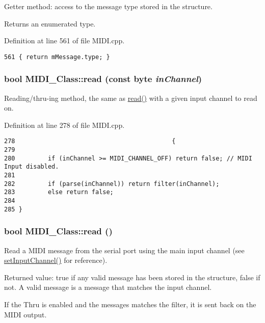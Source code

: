 Getter method: access to the message type stored in the structure. \par
 Returns an enumerated type. 

Definition at line 561 of file MIDI.cpp.

\begin{Code}\begin{verbatim}561 { return mMessage.type; }
\end{verbatim}
\end{Code}


\hypertarget{class_m_i_d_i___class_581b5b973cd81e5aa9d6b91c220342b7}{
\subsubsection[{read}]{\setlength{\rightskip}{0pt plus 5cm}bool MIDI\_\-Class::read (const {\bf byte} {\em inChannel})}}
\label{class_m_i_d_i___class_581b5b973cd81e5aa9d6b91c220342b7}


Reading/thru-ing method, the same as \hyperlink{class_m_i_d_i___class_8e7be5af3a32cb91f596dbb8d8c297bf}{read()} with a given input channel to read on. 

Definition at line 278 of file MIDI.cpp.

\begin{Code}\begin{verbatim}278                                           {
279         
280         if (inChannel >= MIDI_CHANNEL_OFF) return false; // MIDI Input disabled.
281         
282         if (parse(inChannel)) return filter(inChannel);
283         else return false;
284         
285 }
\end{verbatim}
\end{Code}


\hypertarget{class_m_i_d_i___class_8e7be5af3a32cb91f596dbb8d8c297bf}{
\subsubsection[{read}]{\setlength{\rightskip}{0pt plus 5cm}bool MIDI\_\-Class::read ()}}
\label{class_m_i_d_i___class_8e7be5af3a32cb91f596dbb8d8c297bf}


Read a MIDI message from the serial port using the main input channel (see \hyperlink{class_m_i_d_i___class_35a66d47ba598c7ebbee7fbf654dafe8}{setInputChannel()} for reference). \par
 Returned value: true if any valid message has been stored in the structure, false if not. A valid message is a message that matches the input channel. \par
\par
 If the Thru is enabled and the messages matches the filter, it is sent back on the MIDI output. 

